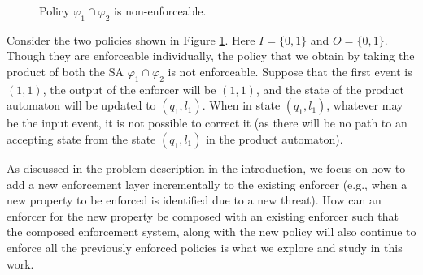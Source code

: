 \begin{figure}
	\caption{Policy $\varphi_1\cap \varphi_2$ is non-enforceable.}
	\label{fig:nonEnf1}
	\vspace{2em}
\end{figure}
\begin{example}
	Consider the two policies shown in Figure \ref{fig:nonEnf1}. Here $I= \{0,1\}$ and $O = \{ 0,1 \}$. Though they are enforceable individually, the policy that we obtain by taking the product of both the SA $\varphi_1 \cap \varphi_2$ is not enforceable. 
	Suppose that the first event is $(1,1)$, the output of the enforcer will be $(1,1)$, and the state of the product automaton will be updated to $(q_1,l_1)$. When in state $(q_1,l_1)$, whatever may be the input event, it is not possible to correct it (as there will be no path to an accepting state from the state $(q_1,l_1)$ in the product automaton). 
\end{example}	

As discussed in the problem description in the introduction, we focus on how to add a new enforcement layer incrementally to the existing enforcer (e.g., when a new property to be enforced is identified due to a new threat). 
How can an enforcer for the new property be composed with an existing enforcer such that the composed enforcement system, along with the new policy\blue{,} will also continue to enforce all the previously enforced policies is what we explore and study in this work.   



